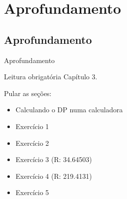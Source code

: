 \documentclass{beamer}
\begin{document}
\section{Aprofundamento}

\subsection{Aprofundamento}

\begin{frame}{Aprofundamento}
  \begin{block}{Leitura obrigatória}
    Capítulo 3.

    Pular as seções:
    \begin{itemize}
    \item Calculando o DP numa calculadora
    \end{itemize}

  \end{block}
  \begin{itemize}
  \item Exercício 1
  \item Exercício 2
  \item Exercício 3 (R: 34.64503)
  \item Exercício 4 (R: 219.4131)
  \item Exercício 5
  \end{itemize}
\end{frame}
\end{document}
